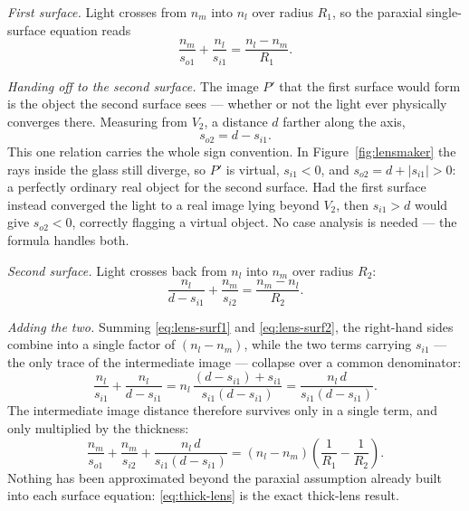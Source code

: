 \emph{First surface.} Light crosses from $n_m$ into $n_l$ over radius $R_1$, so the paraxial single-surface equation reads
\begin{equation}
    \frac{n_m}{s_{o1}} + \frac{n_l}{s_{i1}} = \frac{n_l - n_m}{R_1}.
    \label{eq:lens-surf1}
\end{equation}

\emph{Handing off to the second surface.} The image $P'$ that the first surface would form is the object the second surface sees --- whether or not the light ever physically converges there. Measuring from $V_2$, a distance $d$ farther along the axis,
\begin{equation}
    s_{o2} = d - s_{i1}.
\end{equation}
This one relation carries the whole sign convention. In Figure~\ref{fig:lensmaker} the rays inside the glass still diverge, so $P'$ is virtual, $s_{i1} < 0$, and $s_{o2} = d + |s_{i1}| > 0$: a perfectly ordinary real object for the second surface. Had the first surface instead converged the light to a real image lying beyond $V_2$, then $s_{i1} > d$ would give $s_{o2} < 0$, correctly flagging a virtual object. No case analysis is needed --- the formula handles both.

\emph{Second surface.} Light crosses back from $n_l$ into $n_m$ over radius $R_2$:
\begin{equation}
    \frac{n_l}{d - s_{i1}} + \frac{n_m}{s_{i2}} = \frac{n_m - n_l}{R_2}.
    \label{eq:lens-surf2}
\end{equation}

\emph{Adding the two.} Summing \eqref{eq:lens-surf1} and \eqref{eq:lens-surf2}, the right-hand sides combine into a single factor of $(n_l - n_m)$, while the two terms carrying $s_{i1}$ --- the only trace of the intermediate image --- collapse over a common denominator:
\begin{equation}
    \frac{n_l}{s_{i1}} + \frac{n_l}{d - s_{i1}}
    = n_l\,\frac{(d - s_{i1}) + s_{i1}}{s_{i1}(d - s_{i1})}
    = \frac{n_l\, d}{s_{i1}(d - s_{i1})}.
\end{equation}
The intermediate image distance therefore survives only in a single term, and only multiplied by the thickness:
\begin{equation}
    \frac{n_m}{s_{o1}} + \frac{n_m}{s_{i2}} + \frac{n_l\, d}{s_{i1}(d - s_{i1})}
    = (n_l - n_m)\left(\frac{1}{R_1} - \frac{1}{R_2}\right).
    \label{eq:thick-lens}
\end{equation}
Nothing has been approximated beyond the paraxial assumption already built into each surface equation: \eqref{eq:thick-lens} is the exact thick-lens result.

